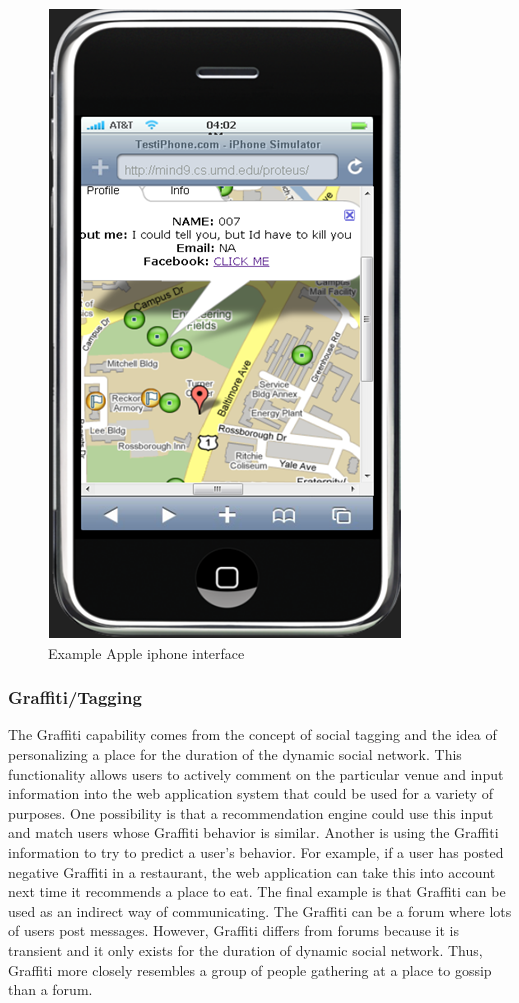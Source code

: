 \documentclass[11pt]{article}
\begin{document}
\begin{figure}[h]
\begin{center}
  \includegraphics[scale=0.5]{phoneapp.png}
\caption{Example Apple iphone interface}
\label{fig:phoneapp} 
\end{center}
\end{figure}



\subsubsection{Graffiti/Tagging}

The Graffiti capability comes from the concept of social tagging
and the idea of personalizing a place for the duration of the dynamic
social network. This functionality allows users to actively comment
on the particular venue and input information into the web
application system that could be used for a variety of purposes. One possibility is
that a recommendation engine could use this input and match users whose
Graffiti behavior is similar. Another is using the Graffiti information
to try to predict a user's behavior. For example, if a user has posted
negative Graffiti in a restaurant, the web application can take this
into account next time it recommends a place to eat. The final example
is that Graffiti can be used as an indirect way of communicating. The
Graffiti can be a forum where lots of users post messages. However,
Graffiti differs from forums because it is transient and it only exists
for the duration of dynamic social network. Thus, Graffiti more closely
resembles a group of people gathering at a place to gossip than a forum.
\end{document}
